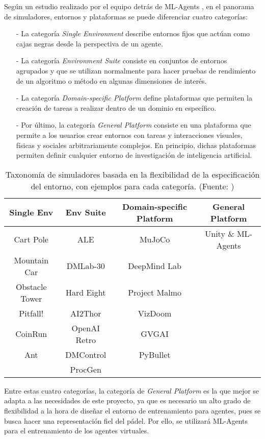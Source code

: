 Según un estudio realizado por el equipo detrás de ML-Agents \parencite{juliani2020}, en el panorama de simuladores, entornos y plataformas se puede diferenciar cuatro categorías:

\begin{enumerate}
    \item[-] La categoría \emph{Single Environment} describe entornos fijos que actúan como cajas negras desde la perspectiva de un agente.
    \item[-] La categoría \emph{Environment Suite} consiste en conjuntos de entornos agrupados y que se utilizan normalmente para hacer pruebas de rendimiento de un algoritmo o método en algunas dimensiones de interés.
    \item[-] La categoría \emph{Domain-specific Platform} define plataformas que permiten la creación de tareas a realizar dentro de un dominio en específico.
    \item[-] Por último, la categoría \emph{General Platform} consiste en una plataforma que permite a los usuarios crear entornos con tareas y interacciones visuales, físicas y sociales arbitrariamente complejos. En principio, dichas plataformas permiten definir cualquier entorno de investigación de inteligencia artificial.
    
\end{enumerate}

\begin{table}[H]
    \centering
    \begin{tabular}{cccc}
        \hline
        Single Env & Env Suite & Domain-specific Platform & General Platform \\
        \hline
        Cart Pole & ALE & MuJoCo & Unity \& ML-Agents \\
        Mountain Car & DMLab-30 & DeepMind Lab &  \\
        Obstacle Tower & Hard Eight & Project Malmo &  \\
        Pitfall! & AI2Thor & VizDoom &  \\
        CoinRun & OpenAI Retro & GVGAI &  \\
        Ant & DMControl & PyBullet & \\
         & ProcGen & & \\
    \hline
    \end{tabular}
    \caption[Taxonomía de simuladores basada en la flexibilidad de la especificación del entorno, con ejemplos para cada categorí]{Taxonomía de simuladores basada en la flexibilidad de la especificación del entorno, con ejemplos para cada categoría. (Fuente: \parencite{juliani2020})}
    \label{taxonomia-entornos}
\end{table}

Entre estas cuatro categorías, la categoría de \emph{General Platform} es la que mejor se adapta a las necesidades de este proyecto, ya que es necesario un alto grado de flexibilidad a la hora de diseñar el entorno de entrenamiento para agentes, pues se busca hacer una representación fiel del pádel. Por ello, se utilizará ML-Agents para el entrenamiento de los agentes virtuales.

